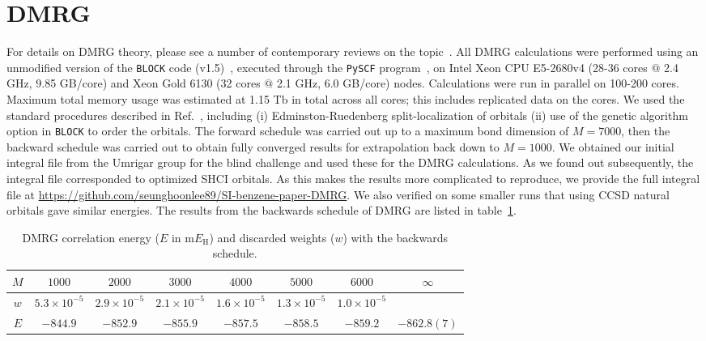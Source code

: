 \documentclass[journal=jcp,manuscript=suppinfo]{achemso}
\begin{document}
\section{DMRG}

For details on DMRG theory, please see a number of contemporary reviews on the topic~\cite{chan_dmrg_2011,wouters_dmrg_2014,knecht_dmrg_2016}. All DMRG calculations were performed using an unmodified version of the {\texttt{BLOCK}} code (v1.5)~\cite{chan_head_gordon_dmrg_jcp_2002,chan_dmrg_jcp_2004,chan_polyacetylenes_jcp_2008,sharma_chan_dmrg_2012,chan_dmrg_2015}, executed through the {\texttt{PySCF}} program~\cite{pyscf_prog,pyscf_paper,pyscf_arxiv_2020}, on Intel Xeon CPU E5-2680v4 (28-36 cores $@$ 2.4 GHz, 9.85 GB/core) and Xeon Gold 6130 (32 cores $@$ 2.1 GHz, 6.0 GB/core) nodes. Calculations
  were run in parallel on 100-200 cores. Maximum total memory usage was estimated at 1.15 Tb in total across all cores; this includes
replicated data on the cores. We used the standard procedures described in Ref.~\cite{chan_dmrg_2015}, including (i) Edminston-Ruedenberg split-localization of orbitals (ii) use of the genetic algorithm option in \texttt{BLOCK} to order the orbitals. The forward schedule was carried out up to a
maximum bond dimension of $M=7000$, then the backward schedule was carried out to obtain fully converged results for extrapolation back down to $M=1000$.
We obtained our initial integral file from the Umrigar group for the blind challenge and used these for the DMRG calculations.
As we found out subsequently, the integral file corresponded to optimized SHCI orbitals. As this makes the results more complicated to reproduce,
we provide the full integral file at \url{https://github.com/seunghoonlee89/SI-benzene-paper-DMRG}. We also
verified on some smaller runs that using CCSD natural orbitals gave similar energies. The results from the backwards schedule of DMRG are listed in table~\ref{tab:DMRG_reverse}.

\begin{table}[ht]
\begin{center}
\caption{DMRG correlation energy ($E$ in m$E_{\text{H}}$) and discarded weights ($w$) with the backwards schedule.}
\label{tab:DMRG_reverse}
\begin{tabular}{cccccccc}
\toprule
$M$ & $1000$               & $2000$               & $3000$               & $4000$               & $5000$                & $6000$                & $\infty$    \\ \midrule\midrule
$w$ & $5.3 \times 10^{-5}$ & $2.9 \times 10^{-5}$ & $2.1 \times 10^{-5}$ & $1.6 \times 10^{-5}$ & $1.3 \times 10^{-5}$  & $1.0 \times 10^{-5}$  &             \\
$E$ & $-844.9$ 		   & $-852.9$  		  & $-855.9$ 		 & $-857.5$ 		& $-858.5$ 		& $-859.2$		& $-862.8(7)$ \\
\midrule
\end{tabular}
\vspace{-1.4cm}
\end{center}
\end{table}
\end{document}
